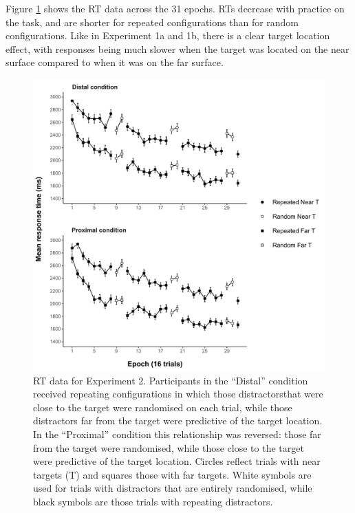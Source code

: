 \documentclass[
  english,
  man,floatsintext]{apa7}
\begin{document}
Figure \ref{fig:Exp2-RT-figure} shows the RT data across the 31 epochs. RTs decrease with practice on the task, and are shorter for repeated configurations than for random configurations. Like in Experiment 1a and 1b, there is a clear target location effect, with responses being much slower when the target was located on the near surface compared to when it was on the far surface.



\begin{figure}

{\centering \includegraphics{CCVR_manuscript_files/figure-latex/Exp2-RT-figure-1} 

}

\caption{RT data for Experiment 2. Participants in the ``Distal'' condition received repeating configurations in which those distractorsthat were close to the target were randomised on each trial, while those distractors far from the target were predictive of the target location. In the ``Proximal'' condition this relationship was reversed: those far from the target were randomised, while those close to the target were predictive of the target location. Circles reflect trials with near targets (T) and squares those with far targets. White symbols are used for trials with distractors that are entirely randomised, while black symbols are those trials with repeating distractors.}\label{fig:Exp2-RT-figure}
\end{figure}
\end{document}
